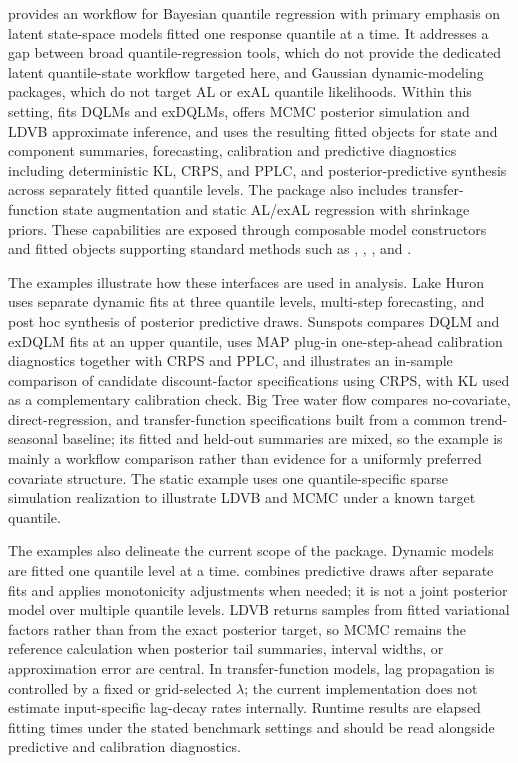 \documentclass{jss}
\begin{document}
 provides an  workflow for Bayesian quantile regression with primary emphasis on latent state-space models fitted one response quantile at a time. It addresses a gap between broad quantile-regression tools, which do not provide the dedicated latent quantile-state workflow targeted here, and Gaussian dynamic-modeling packages, which do not target AL or exAL quantile likelihoods. Within this setting,  fits DQLMs and exDQLMs, offers MCMC posterior simulation and LDVB approximate inference, and uses the resulting fitted objects for state and component summaries, forecasting, calibration and predictive diagnostics including deterministic KL, CRPS, and PPLC, and posterior-predictive synthesis across separately fitted quantile levels. The package also includes transfer-function state augmentation and static AL/exAL regression with shrinkage priors. These capabilities are exposed through composable model constructors and fitted objects supporting standard methods such as , , , and .

The examples illustrate how these interfaces are used in analysis. Lake Huron uses separate dynamic fits at three quantile levels, multi-step forecasting, and post hoc synthesis of posterior predictive draws. Sunspots compares DQLM and exDQLM fits at an upper quantile, uses MAP plug-in one-step-ahead calibration diagnostics together with CRPS and PPLC, and illustrates an in-sample comparison of candidate discount-factor specifications using CRPS, with KL used as a complementary calibration check. Big Tree water flow compares no-covariate, direct-regression, and transfer-function specifications built from a common trend-seasonal baseline; its fitted and held-out summaries are mixed, so the example is mainly a workflow comparison rather than evidence for a uniformly preferred covariate structure. The static example uses one quantile-specific sparse simulation realization to illustrate LDVB and MCMC under a known target quantile.


The examples also delineate the current scope of the package. Dynamic models are fitted one quantile level at a time.  combines predictive draws after separate fits and applies monotonicity adjustments when needed; it is not a joint posterior model over multiple quantile levels. LDVB returns samples from fitted variational factors rather than from the exact posterior target, so MCMC remains the reference calculation when posterior tail summaries, interval widths, or approximation error are central. In transfer-function models, lag propagation is controlled by a fixed or grid-selected \(\lambda\); the current implementation does not estimate input-specific lag-decay rates internally. Runtime results are elapsed fitting times under the stated benchmark settings and should be read alongside predictive and calibration diagnostics.
\end{document}
